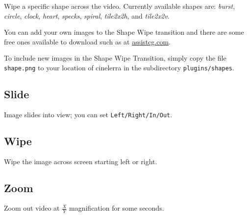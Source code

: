Wipe a specific shape across the video. Currently available shapes are: \textit{burst}, \textit{circle}, \textit{clock}, \textit{heart}, \textit{specks}, \textit{spiral}, \textit{tile2x2h}, and \textit{tile2x2v}. 

You can add your own images to the Shape Wipe transition and there are some free ones available to download such as at \url{assistcg.com}.

To include new images in the Shape Wipe Transition, simply copy the file \texttt{{shape}.png} to your location of cinelerra in the subdirectory \texttt{plugins/shapes}.

\subsection*{Slide}%
\label{sub:slide}

Image slides into view; you can set \texttt{Left/Right/In/Out}.

\subsection*{Wipe}%
\label{sub:wipe}

Wipe the image across screen starting left or right.

\subsection*{Zoom}%
\label{sub:zoom}

Zoom out video at $\frac{X}{Y}$ magnification for some seconds.


